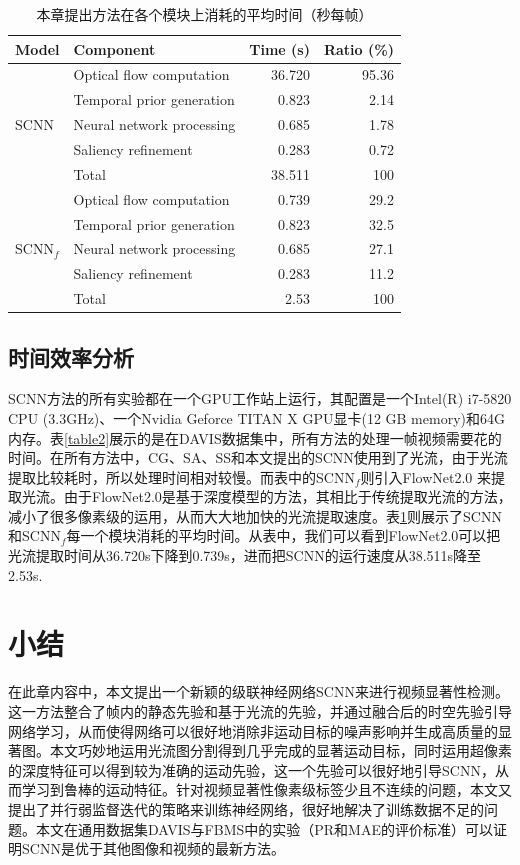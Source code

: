 \begin{table}[htbp]
\centering
\caption{本章提出方法在各个模块上消耗的平均时间（秒每帧）}
\renewcommand{\arraystretch}{1.2}
\begin{tabular}{ |l|l|r|r| }
\hline
\hline
Model & Component & Time (s) & Ratio (\%)\\ \hline
\multirow{5}{*}{SCNN} & Optical flow computation & 36.720 & 95.36\\
 & Temporal prior generation & 0.823 & 2.14\\
 & Neural network processing & 0.685 & 1.78\\
 & Saliency refinement & 0.283 & 0.72\\\cline{2-4}
 & Total & 38.511 & 100\\ \hline
\hline
\multirow{5}{*}{SCNN$_f$} & Optical flow computation & 0.739 & 29.2\\
 & Temporal prior generation & 0.823 & 32.5\\
 & Neural network processing & 0.685 & 27.1\\
 & Saliency refinement & 0.283 & 11.2\\\cline{2-4}
 & Total & 2.53 & 100\\ \hline

\end{tabular}
\label{table3}
\end{table}

\subsection{时间效率分析}

SCNN方法的所有实验都在一个GPU工作站上运行，其配置是一个Intel(R) i7-5820 CPU (3.3GHz)、一个Nvidia Geforce TITAN X GPU显卡(12 GB memory)和64G内存。表\ref{table2}展示的是在DAVIS数据集中，所有方法的处理一帧视频需要花的时间。在所有方法中，CG、SA、SS和本文提出的SCNN使用到了光流，由于光流提取比较耗时，所以处理时间相对较慢。而表中的SCNN$_f$则引入FlowNet2.0 \cite{8099662}来提取光流。由于FlowNet2.0是基于深度模型的方法，其相比于传统提取光流的方法\cite{Sun2014A}，减小了很多像素级的运用，从而大大地加快的光流提取速度。表\ref{table3}则展示了SCNN和SCNN$_f$每一个模块消耗的平均时间。从表中，我们可以看到FlowNet2.0可以把光流提取时间从36.720s下降到0.739s，进而把SCNN的运行速度从38.511s降至2.53s.

\section{小结}

在此章内容中，本文提出一个新颖的级联神经网络SCNN来进行视频显著性检测。这一方法整合了帧内的静态先验和基于光流的先验，并通过融合后的时空先验引导网络学习，从而使得网络可以很好地消除非运动目标的噪声影响并生成高质量的显著图。本文巧妙地运用光流图分割得到几乎完成的显著运动目标，同时运用超像素的深度特征可以得到较为准确的运动先验，这一个先验可以很好地引导SCNN，从而学习到鲁棒的运动特征。针对视频显著性像素级标签少且不连续的问题，本文又提出了并行弱监督迭代的策略来训练神经网络，很好地解决了训练数据不足的问题。本文在通用数据集DAVIS与FBMS中的实验（PR和MAE的评价标准）可以证明SCNN是优于其他图像和视频的最新方法。